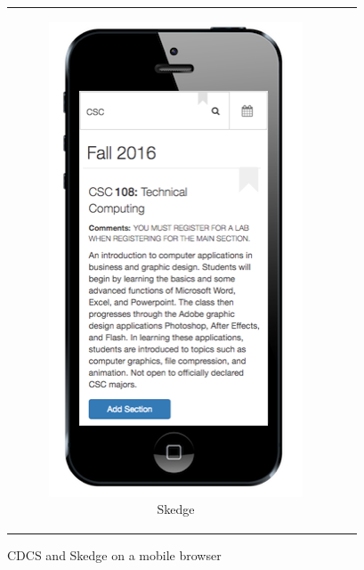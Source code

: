 \begin{figure}[ht]
\begin{tabular}{c c}
    \begin{subfigure}[h]{4.7cm}
      \centering
      \includegraphics[width=1.00\textwidth]{images/skedge/mobile}
      \caption{Skedge} \label{fig:sk-mobile}
    \end{subfigure}
  \end{tabular}
  \caption{CDCS and Skedge on a mobile browser}
\end{figure}

